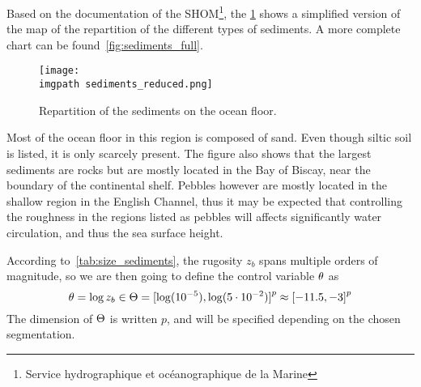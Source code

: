 \documentclass[../../Main_ManuscritThese.tex]{subfiles}
\newcommand{\zob}{z_b}
\newcommand\imgpath{/home/victor/acadwriting/Manuscrit/Text/Chapter5/img/}
\begin{document}
Based on the documentation of the SHOM\footnote{Service hydrographique
  et océanographique de la Marine}, the \cref{fig:sediments_reduced}
shows a simplified version of the map of the repartition of the
different types of sediments. A more complete chart can be
found~\cref{fig:sediments_full}.
\begin{figure}[ht]
  \centering
  \texttt{[image: \\imgpath sediments\_reduced.png]}
  \caption{\label{fig:sediments_reduced} Repartition of the sediments
    on the ocean floor.}
\end{figure}

Most of the ocean floor in this region is composed of sand. Even
though siltic soil is listed, it is only scarcely present. The figure
also shows that the largest sediments are rocks but are mostly located
in the Bay of Biscay, near the boundary of the continental
shelf. Pebbles however are mostly located in the shallow region in the
English Channel, thus it may be expected that controlling the
roughness in the regions listed as pebbles will affects significantly
water circulation, and thus the sea surface height.

According to~\cref{tab:size_sediments}, the rugosity $\zob$ spans
multiple orders of magnitude, so we are then going to define the control
variable $\theta$ as
\begin{equation}
  \kk = \log \zob \in \Kspace = \interval{\log(10^{-5})}{\log (5\cdot 10^{-2})}^p \approx \interval{-11.5}{-3}^p
\end{equation}
The dimension of $\Theta$ is written $p$, and will be specified
depending on the chosen segmentation.
\end{document}
